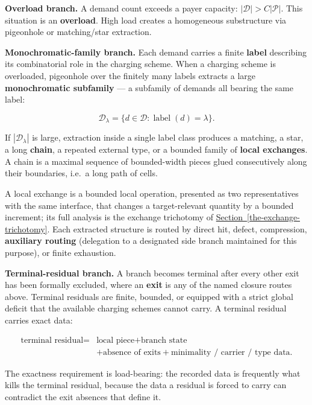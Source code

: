 \documentclass[
  11pt,
]{article}
\theoremstyle{definition}
\newcommand{\secref}[1]{\hyperref[#1]{Section~\ref*{#1}}}
\begin{document}
\textbf{Overload branch.} A demand count exceeds a payer capacity:
\(|\mathcal D| > C|\mathcal P|\). This situation is an
\textbf{overload}. High load creates a homogeneous substructure via
pigeonhole or matching/star extraction.

\textbf{Monochromatic-family branch.} Each demand carries a finite
\textbf{label} describing its combinatorial role in the charging scheme.
When a charging scheme is overloaded, pigeonhole over the finitely many
labels extracts a large \textbf{monochromatic subfamily} --- a subfamily
of demands all bearing the same label:

\[
\mathcal D_\lambda = \{d \in \mathcal D : \operatorname{label}(d) = \lambda\}.
\]

If \(|\mathcal D_\lambda|\) is large, extraction inside a single label
class produces a matching, a star, a long \textbf{chain}, a repeated
external type, or a bounded family of \textbf{local exchanges}. A chain
is a maximal sequence of bounded-width pieces glued consecutively along
their boundaries, i.e.~a long path of cells.

A local exchange is a bounded local operation, presented as two
representatives with the same interface, that changes a target-relevant
quantity by a bounded increment; its full analysis is the exchange
trichotomy of \secref{the-exchange-trichotomy}. Each extracted structure is routed by direct
hit, defect, compression, \textbf{auxiliary routing} (delegation to a
designated side branch maintained for this purpose), or finite
exhaustion.

\textbf{Terminal-residual branch.} A branch becomes terminal after every
other exit has been formally excluded, where an \textbf{exit} is any of
the named closure routes above. Terminal residuals are finite, bounded,
or equipped with a strict global deficit that the available charging
schemes cannot carry. A terminal residual carries exact data:

\[
\begin{aligned}
\text{terminal residual}
={}&
\text{local piece}
+
\text{branch state}\\
&+
\text{absence of exits}
+
\text{minimality / carrier / type data}.
\end{aligned}
\]

The exactness requirement is load-bearing: the recorded data is
frequently what kills the terminal residual, because the data a residual
is forced to carry can contradict the exit absences that define it.
\end{document}
